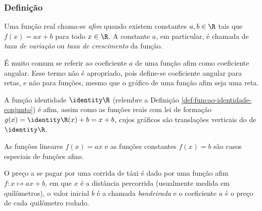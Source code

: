 \subsubsection{Definição}

\begin{definition}
Uma função real chama-se \emph{afim} quando existem constantes $a, b
\in \R$ tais que $f(x) = ax +b$ para todo $x\in \R$. 
A constante $a$, em particular, é chamada de \emph{taxa de variação} ou \emph{taxa de crescimento} da função.
\end{definition}

\begin{remark}
É muito comum se referir ao coeficiente $a$ de uma função afim como coeficiente angular.
Esse termo não é apropriado, pois define-se coeficiente angular para
retas, e não para funções, mesmo que o gráfico de uma
função afim seja uma reta.
\end{remark}

\begin{example}
A função identidade $\identity \R$ (relembre a Definição \ref{def:funcao-identidade-conjunto}) é afim, 
assim como as funções reais com lei de formação $g(x) = \identity \R (x)+b = x+b$, 
cujos gráficos são translações verticais do de $\identity \R$.
\end{example}

\begin{example}
As funções lineares $f(x) = ax$ e as funções constantes $f(x) = b$ são casos especiais de funções afins.
\end{example}

\begin{example}
O preço a se pagar por uma corrida de táxi é dado por uma função
afim $f: x \mapsto ax+b$, em que $x$ é a distância percorrida
(usualmente medida em quilômetros), o valor inicial $b$ é a chamada
\emph{bandeirada} e o coeficiente $a$ é o preço de cada quilômetro
rodado.
\end{example}